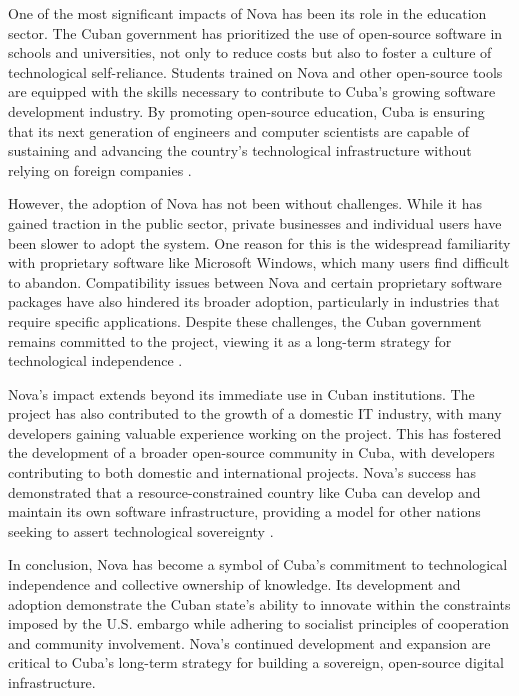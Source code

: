 \begin{refsection}
One of the most significant impacts of Nova has been its role in the education sector. The Cuban government has prioritized the use of open-source software in schools and universities, not only to reduce costs but also to foster a culture of technological self-reliance. Students trained on Nova and other open-source tools are equipped with the skills necessary to contribute to Cuba’s growing software development industry. By promoting open-source education, Cuba is ensuring that its next generation of engineers and computer scientists are capable of sustaining and advancing the country’s technological infrastructure without relying on foreign companies \cite[pp.~12-34]{kapcia}.

However, the adoption of Nova has not been without challenges. While it has gained traction in the public sector, private businesses and individual users have been slower to adopt the system. One reason for this is the widespread familiarity with proprietary software like Microsoft Windows, which many users find difficult to abandon. Compatibility issues between Nova and certain proprietary software packages have also hindered its broader adoption, particularly in industries that require specific applications. Despite these challenges, the Cuban government remains committed to the project, viewing it as a long-term strategy for technological independence \cite[pp.~23-45]{perez}.

Nova’s impact extends beyond its immediate use in Cuban institutions. The project has also contributed to the growth of a domestic IT industry, with many developers gaining valuable experience working on the project. This has fostered the development of a broader open-source community in Cuba, with developers contributing to both domestic and international projects. Nova’s success has demonstrated that a resource-constrained country like Cuba can develop and maintain its own software infrastructure, providing a model for other nations seeking to assert technological sovereignty \cite[pp.~56-87]{kapcia}.

In conclusion, Nova has become a symbol of Cuba’s commitment to technological independence and collective ownership of knowledge. Its development and adoption demonstrate the Cuban state’s ability to innovate within the constraints imposed by the U.S. embargo while adhering to socialist principles of cooperation and community involvement. Nova’s continued development and expansion are critical to Cuba’s long-term strategy for building a sovereign, open-source digital infrastructure.


\end{refsection}
